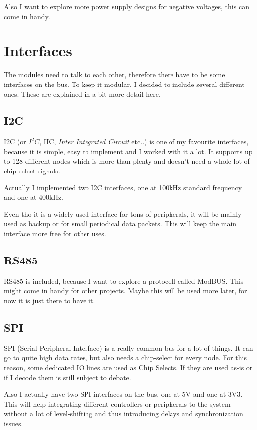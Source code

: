 Also I want to explore more power supply designs for negative voltages, this can come in handy. 

\section{Interfaces}
The modules need to talk to each other, therefore there have to be some interfaces on the bus. To keep it modular, I decided to include several different ones. These are explained in a bit more detail here.

\subsection{I2C}
I2C (or $I^2C$, IIC, \textit{Inter Integrated Circuit} etc..) is one of my favourite interfaces, because it is simple, easy to implement and I worked with it a lot. It supports up to 128 different nodes which is more than plenty and doesn't need a whole lot of chip-select signals. 

Actually I implemented two I2C interfaces, one at 100kHz standard frequency and one at 400kHz. 

Even tho it is a widely used interface for tons of peripherals, it will be mainly used as backup or for small periodical data packets. This will keep the main interface more free for other uses. 

\subsection{RS485}
RS485 is included, because I want to explore a protocoll called ModBUS. This might come in handy for other projects. Maybe this will be used more later, for now it is just there to have it. 

\subsection{SPI}
SPI (Serial Peripheral Interface) is a really common bus for a lot of things. It can go to quite high data rates, but also needs a chip-select for every node. For this reason, some dedicated IO lines are used as Chip Selects. If they are used as-is or if I decode them is still subject to debate. 

Also I actually have two SPI interfaces on the bus. one at 5V and one at 3V3. This will help integrating different controllers or peripherals to the system without a lot of level-shifting and thus introducing delays and synchronization issues. 

